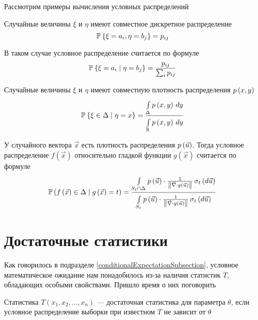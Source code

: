 Рассмотрим примеры вычисления условных распределений

\begin{example}
  Случайные величины $\xi$ и $\eta$ имеют совместное дискретное распределение
  $$\Probability{\xi = a_i, \eta = b_j} = p_{ij}$$

  В таком случае условное распределение считается по формуле
  \begin{align*}
      \Probability{\xi = a_i \mcond \eta = b_j}
      = \frac{p_{ij}}{\sum_i p_{ij}}
  \end{align*}
\end{example}

\begin{example}
  Случайные величины $\xi$ и $\eta$ имеют
  совместную плотность распределения $\pdf{x,y}$
  \begin{align*}
      \Probability{\xi \in \Delta \mcond \eta = x}
      = \frac{\integral{\Delta}{}{y}{\pdf{x,y}}}
      {\integral{\mathbb{R}}{}{y}{\pdf{x,y}}}
  \end{align*}
\end{example}

\begin{example}
  У случайного вектора $\vec{x}$ есть плотность распределения $\pdf{\vec{u}}$.
  Тогда условное распределение $f\left( \vec{x} \right)$ относительно
  гладкой функции $g\left( \vec{x} \right)$ считается по формуле
  $$\probability{f\left( \vec{x} \right) \in \Delta
      \mcond g\left( \vec{x} \right) = t}
      = \frac{\integrall{S_t \cap \Delta}{\sigma_{t}\left(d\vec{u} \right)}{
      \pdf{\vec{u}} \cdot \frac{1}{
      \left\| \vec{\nabla} \cdot g\left( \vec{u} \right) \right\|}}}
      {\integrall{S_t}{\sigma_{t}\left(d\vec{u} \right)}{
      \pdf{\vec{u}} \cdot \frac{1}{
    \left\| \vec{\nabla}
        \cdot g\left( \vec{u} \right) \right\|}}}$$
\end{example}

\section{Достаточные статистики}
Как говорилось в подразделе \ref{conditionalExpectationSubsection},
условное математическое ожидание нам понадобилось из-за наличия
статистик $T$, обладающих особыми свойствами.
Пришло время о них поговорить

\begin{definition}
  Статистика $T\left( x_1, x_2, \dots, x_n \right)$ --- достаточная статистика
  для параметра $\theta$, если условное распределение выборки
  при известном $T$ не зависит от $\theta$
\end{definition}

